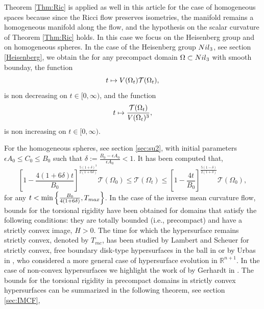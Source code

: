 \documentclass{amsart}
\theoremstyle{definition}
\theoremstyle{remark}
\newcommand{\V}{{\rm V}}
\begin{document}
 Theorem \ref{Thm:Ric} is  applied as well in this article  for the case of homogeneous spaces because since the Ricci flow preserves isometries, the manifold remains a homogeneous manifold along the flow, and the hypothesis on the scalar curvature of Theorem \ref{Thm:Ric} holds. In this case we focus on the Heisenberg group and on homogeneous spheres. In the case of the Heisenberg group ${\rm Nil}_3$, see section \ref{Heisenberg}, we obtain the for any precompact domain $\Omega\subset{\rm Nil}_3$ with smooth bounday, the function
 $$
t\mapsto \V(\Omega_t)\mathcal{T}(\Omega_t),
    $$
    is non decreasing on $t\in [0,\infty)$, and the function
    $$
t\mapsto \frac{\mathcal{T}(\Omega_t)}{\V(\Omega_t)^3},
    $$
    is non increasing on $t\in [0,\infty)$.
        
For the homogeneous spheres, see section \ref{sec:su2}, with initial parameters
    $
\epsilon A_0\leq C_0\leq B_0$ such that $ \delta:=\frac{B_0-\epsilon A_0}{\epsilon A_0}<1
$.
It has been computed that,
$$
\left[1-\frac{4(1+6\delta)t}{B_0}\right]^{\frac{5(1+\delta)^3}{2(1+6\delta)}}\mathcal{T}(\Omega_0)\leq \mathcal{T}(\Omega_t)\leq \left[1-\frac{4t}{B_0}\right]^{\frac{5(1-\delta)}{2(1+\delta)}}\mathcal{T}(\Omega_0),
$$
 for any $t<\min\left\{\frac{B_0}{4(1+6\delta)},T_{\rm max}\right\}$.
In the case of the inverse mean curvature flow, bounds for the torsional rigidity have been obtained for domains that satisfy the following conditions: they are totally bounded (i.e., precompact) and have a strictly convex image, $H > 0$. The time for which the hypersurface remains strictly convex, denoted by $T_{mc}$, has been studied by Lambert and Scheuer for strictly convex, free boundary disk-type hypersurfaces in the ball in \cite{Lambert2016inver-34677} or by Urbas in \cite{Urbas}, who considered a more general case of hypersurface evolution in $\mathbb{R}^{n+1}$. In the case of non-convex hypersurfaces we highlight the work of by Gerhardt in \cite{maxtime}. The bounds for the torsional rigidity in precompact domains in strictly convex hypersurfaces can be summarized in the following theorem, see section \ref{sec:IMCF},
\end{document}
